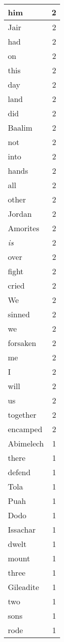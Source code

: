 \begin{center}
\begin{longtable}{l|r}
him & 2\\ \hline 
Jair & 2\\ \hline 
had & 2\\ \hline 
on & 2\\ \hline 
this & 2\\ \hline 
day & 2\\ \hline 
land & 2\\ \hline 
did & 2\\ \hline 
Baalim & 2\\ \hline 
not & 2\\ \hline 
into & 2\\ \hline 
hands & 2\\ \hline 
all & 2\\ \hline 
other & 2\\ \hline 
Jordan & 2\\ \hline 
Amorites & 2\\ \hline 
\emph{is} & 2\\ \hline 
over & 2\\ \hline 
fight & 2\\ \hline 
cried & 2\\ \hline 
We & 2\\ \hline 
sinned & 2\\ \hline 
we & 2\\ \hline 
forsaken & 2\\ \hline 
me & 2\\ \hline 
I & 2\\ \hline 
will & 2\\ \hline 
us & 2\\ \hline 
together & 2\\ \hline 
encamped & 2\\ \hline 
Abimelech & 1\\ \hline 
there & 1\\ \hline 
defend & 1\\ \hline 
Tola & 1\\ \hline 
Puah & 1\\ \hline 
Dodo & 1\\ \hline 
Issachar & 1\\ \hline 
dwelt & 1\\ \hline 
mount & 1\\ \hline 
three & 1\\ \hline 
Gileadite & 1\\ \hline 
two & 1\\ \hline 
sons & 1\\ \hline 
rode & 1\\ \hline 

\end{longtable}
\end{center}
